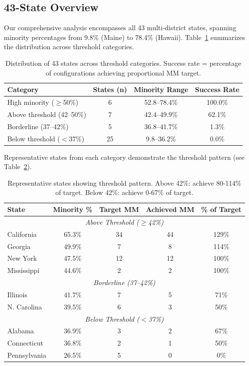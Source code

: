 \subsection{43-State Overview}

Our comprehensive analysis encompasses all 43 multi-district states, spanning minority percentages from 9.8\% (Maine) to 78.4\% (Hawaii). Table~\ref{tab:demographics_summary} summarizes the distribution across threshold categories.

\begin{table}[h]
\centering
\begin{tabular}{lccc}
\toprule
\textbf{Category} & \textbf{States (n)} & \textbf{Minority Range} & \textbf{Success Rate} \\
\midrule
High minority ($\geq$50\%)    & 6  & 52.8--78.4\% & 100.0\% \\
Above threshold (42--50\%)    & 7  & 42.4--49.9\% & 62.1\%  \\
Borderline (37--42\%)         & 5  & 36.8--41.7\% & 1.3\%   \\
Below threshold ($<$37\%)     & 25 & 9.8--36.2\%  & 0.0\%   \\
\bottomrule
\end{tabular}
\caption{Distribution of 43 states across threshold categories. Success rate = percentage of configurations achieving proportional MM target.}
\label{tab:demographics_summary}
\end{table}

Representative states from each category demonstrate the threshold pattern (see Table~\ref{tab:representative_states}).

\begin{table}[h]
\centering
\begin{tabular}{lcccc}
\toprule
\textbf{State} & \textbf{Minority \%} & \textbf{Target MM} & \textbf{Achieved MM} & \textbf{\% of Target} \\
\midrule
\multicolumn{5}{c}{\textit{Above Threshold ($\geq$42\%)}} \\
California    & 65.3\% & 34 & 44 & 129\% \\
Georgia       & 49.9\% & 7  & 8  & 114\% \\
New York      & 47.5\% & 12 & 12 & 100\% \\
Mississippi   & 44.6\% & 2  & 2  & 100\% \\
\midrule
\multicolumn{5}{c}{\textit{Borderline (37--42\%)}} \\
Illinois      & 41.7\% & 7  & 5  & 71\% \\
N. Carolina   & 39.5\% & 6  & 3  & 50\% \\
\midrule
\multicolumn{5}{c}{\textit{Below Threshold ($<$37\%)}} \\
Alabama       & 36.9\% & 3  & 2  & 67\% \\
Connecticut   & 36.8\% & 2  & 1  & 50\% \\
Pennsylvania  & 26.5\% & 5  & 0  & 0\% \\
\bottomrule
\end{tabular}
\caption{Representative states showing threshold pattern. Above 42\%: achieve 80-114\% of target. Below 42\%: achieve 0-67\% of target.}
\label{tab:representative_states}
\end{table}

